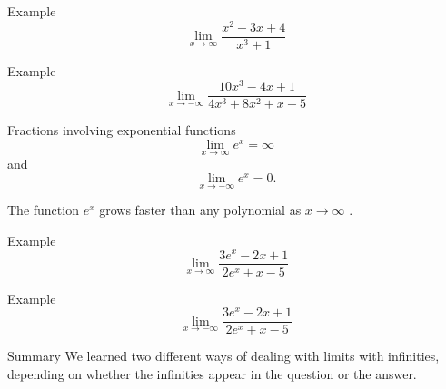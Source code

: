 \documentclass[t]{beamer}
\begin{document}
\begin{frame}{Example}
$$\lim_{x \to \infty} \frac{x^2 -3x +4}{x^3 +1}$$
\end{frame}


\begin{frame}{Example}
$$\lim_{x \to -\infty} \frac{10x^3 -4x + 1}{4x^3 + 8 x^2 +x -5}$$
\end{frame}

\begin{frame}{Fractions involving exponential functions}
$$\lim_{x \to \infty} e^x = \infty$$
and
$$\lim_{x \to -\infty} e^x = 0.$$

The function $e^x$ grows faster than any polynomial as $x \to \infty$ .
\end{frame}


\begin{frame}{Example}
$$\lim_{x \to \infty} \frac{3e^x -2x + 1}{2e^x +x -5}$$
\end{frame}

\begin{frame}{Example}
$$\lim_{x \to -\infty} \frac{3e^x -2x + 1}{2e^x +x -5}$$
\end{frame}


\begin{frame}{Summary}
We learned two different ways of dealing with limits with infinities,
depending on whether the infinities appear in the question or the answer.
\end{frame}
\end{document}

